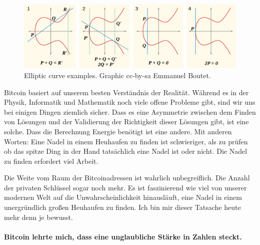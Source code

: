 \begin{figure}
  \includegraphics{assets/images/elliptic-curve-examples.png}
  \caption{Elliptic curve examples. Graphic cc-by-sa Emmanuel Boutet.}
  \label{fig:elliptic-curve-examples}
\end{figure}

Bitcoin basiert auf unserem besten Verständnis der Realität. Während es in der
Physik, Informatik und Mathematik noch viele offene Probleme gibt, sind wir uns
bei einigen Dingen ziemlich sicher. Dass es eine Asymmetrie zwischen dem Finden
von Lösungen und der Validierung der Richtigkeit dieser Lösungen gibt, ist eine
solche. Dass die Berechnung Energie benötigt ist eine andere. Mit anderen
Worten: Eine Nadel in einem Heuhaufen zu finden ist schwieriger, als zu prüfen
ob das spitze Ding in der Hand tatsächlich eine Nadel ist oder nicht. Die Nadel
zu finden erfordert viel Arbeit.

Die Weite vom Raum der Bitcoinadressen ist wahrlich unbegreiflich. Die Anzahl
der privaten Schlüssel sogar noch mehr. Es ist faszinierend wie viel von unserer
modernen Welt auf die Unwahrscheinlichkeit hinausläuft, eine Nadel in einem
unergründlich großen Heuhaufen zu finden. Ich bin mir dieser Tatsache heute mehr
denn je bewusst.

\paragraph{Bitcoin lehrte mich, dass eine unglaubliche Stärke in Zahlen steckt.}

